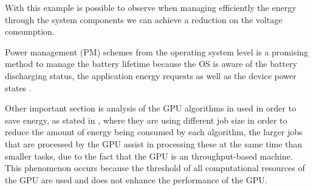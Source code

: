 \documentclass[conference]{IEEEtran}
\begin{document}
\begin{table}[h]
\caption{Daily energy use and battery life under a number of usage patterns  \cite{CarrollAnalysis}.}
\end{table}

With this example is possible to observe when managing efficiently the energy through the system components we can achieve a reduction on the voltage consumption.
 
Power management (PM) schemes from the operating system level is a promising method to manage the battery lifetime because the OS is aware of the battery discharging status, the application energy requests as well as the device power states \cite{PADM02}.
 
Other important section is analysis of the GPU algorithms in used in order to save energy, as stated in \cite{ARIUN01}, where they are using different job size in order to reduce the amount of energy being consumed by each algorithm, the larger jobs that are  processed by the GPU assist in processing these at the same time than smaller tasks, due to the fact that the GPU is an throughput-based machine. This phenomenon occurs because the threshold of all computational resources of the GPU are used and does not enhance the performance of the GPU. \cite{ARIUN01}
 
\end{document}

